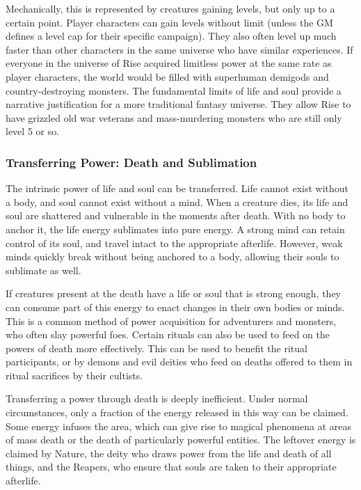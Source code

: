             Mechanically, this is represented by creatures gaining levels, but only up to a certain point.
            Player characters can gain levels without limit (unless the GM defines a level cap for their specific campaign).
            They also often level up much faster than other characters in the same universe who have similar experiences.
            If everyone in the universe of Rise acquired limitless power at the same rate as player characters, the world would be filled with superhuman demigods and country-destroying monsters.
            The fundamental limits of life and soul provide a narrative justification for a more traditional fantasy universe.
            They allow Rise to have grizzled old war veterans and mass-murdering monsters who are still only level 5 or so.

        \subsubsection{Transferring Power: Death and Sublimation}
            The intrinsic power of life and soul can be transferred.
            Life cannot exist without a body, and soul cannot exist without a mind.
            When a creature dies, its life and soul are shattered and vulnerable in the moments after death.
            With no body to anchor it, the life energy sublimates into pure energy.
            A strong mind can retain control of its soul, and travel intact to the appropriate afterlife.
            However, weak minds quickly break without being anchored to a body, allowing their souls to sublimate as well.

            If creatures present at the death have a life or soul that is strong enough, they can consume part of this energy to enact changes in their own bodies or minds.
            This is a common method of power acquisition for adventurers and monsters, who often slay powerful foes.
            Certain rituals can also be used to feed on the powers of death more effectively.
            This can be used to benefit the ritual participants, or by demons and evil deities who feed on deaths offered to them in ritual sacrifices by their cultists.

            Transferring a power through death is deeply inefficient.
            Under normal circumstances, only a fraction of the energy released in this way can be claimed.
            Some energy infuses the area, which can give rise to magical phenomena at areas of mass death or the death of particularly powerful entities.
            The leftover energy is claimed by Nature, the deity who draws power from the life and death of all things, and the Reapers, who ensure that souls are taken to their appropriate afterlife.

